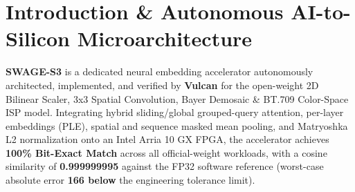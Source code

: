 \documentclass[11pt,a4paper]{article}
\begin{document}
\section{Introduction \& Autonomous AI-to-Silicon Microarchitecture}

\textbf{SWAGE-S3} is a dedicated neural embedding accelerator autonomously architected, implemented, and verified by \textbf{Vulcan} for the open-weight 2D Bilinear Scaler,\allowbreak{} 3x3 Spatial Convolution,\allowbreak{} Bayer Demosaic \& BT.709 Color-Space ISP model. Integrating hybrid sliding/global grouped-query attention, per-layer embeddings (PLE), spatial and sequence masked mean pooling, and Matryoshka L2 normalization onto an Intel Arria 10 GX FPGA, the accelerator achieves \textbf{100\% Bit-Exact Match} across all official-weight workloads, with a cosine similarity of \textbf{0.999999995} against the FP32 software reference (worst-case absolute error \textbf{166\texttimes{} below} the engineering tolerance limit).

\vspace{2pt}
\end{document}
